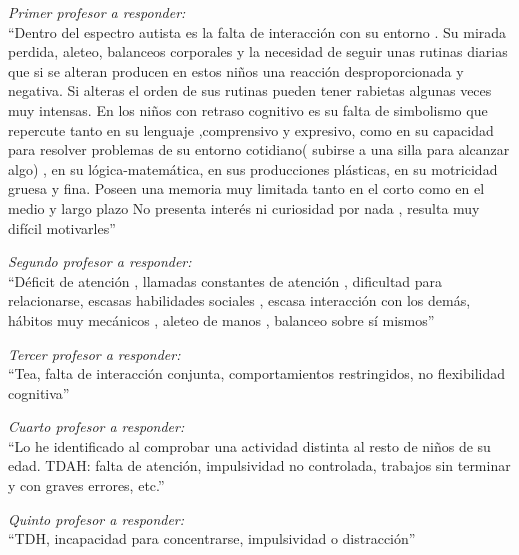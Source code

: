 \documentclass[letterpaper,12pt]{article}
\begin{document}
\begin{flushleft}
\emph{Primer profesor a responder: }\\
``Dentro del espectro autista es la falta de interacción  con su entorno .
Su mirada perdida, aleteo, balanceos corporales y la necesidad de seguir unas rutinas diarias que si se alteran producen en estos niños una reacción desproporcionada y negativa. Si alteras el orden de sus rutinas pueden tener rabietas algunas veces muy intensas.
En los niños con retraso cognitivo es su falta de simbolismo que repercute tanto en su lenguaje ,comprensivo y expresivo, como en su capacidad para resolver problemas de su entorno cotidiano( subirse a una silla para alcanzar algo) , en su lógica-matemática, en sus producciones plásticas, en su motricidad gruesa y fina.
Poseen una memoria muy limitada tanto en el corto como en el medio y largo plazo
No presenta interés ni curiosidad por nada , resulta muy difícil motivarles'' \\
\end{flushleft}

\begin{flushleft}
\emph{Segundo profesor a responder: }\\
``Déficit de atención , llamadas constantes de atención , dificultad para relacionarse, escasas habilidades sociales , escasa interacción con los demás, hábitos muy mecánicos , aleteo de manos , balanceo sobre sí mismos''
\end{flushleft}

\begin{flushleft}
\emph{Tercer profesor a responder: }\\
``Tea, falta de interacción conjunta, comportamientos restringidos, no flexibilidad cognitiva''
\end{flushleft}

\begin{flushleft}
\emph{Cuarto profesor a responder: }\\
``Lo he identificado al comprobar una actividad distinta al resto de niños de su edad. TDAH: falta de atención, impulsividad no controlada, trabajos sin terminar y con graves errores, etc.''
\end{flushleft}

\begin{flushleft}
\emph{Quinto profesor a responder: }\\
``TDH, incapacidad para concentrarse, impulsividad o distracción''
\end{flushleft}
\end{document}
